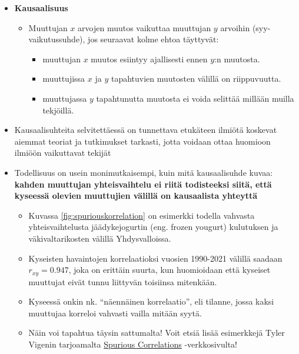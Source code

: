 \documentclass[
]{book}
\providecommand{\tightlist}{%
  \setlength{\itemsep}{0pt}\setlength{\parskip}{0pt}}
\begin{document}
\FloatBarrier

\begin{itemize}
\item
  \textbf{Kausaalisuus}

  \begin{itemize}
  \tightlist
  \item
    Muuttujan \(x\) arvojen muutos vaikuttaa muuttujan \(y\) arvoihin (syy-vaikutussuhde), jos seuraavat kolme ehtoa täyttyvät:

    \begin{itemize}
    \tightlist
    \item
      muuttujan \(x\) muutos esiintyy ajallisesti ennen \(y\):n muutosta.
    \item
      muuttujissa \(x\) ja \(y\) tapahtuvien muutosten välillä on riippuvuutta.
    \item
      muuttujassa \(y\) tapahtunutta muutosta ei voida selittää millään muilla tekjöillä.
    \end{itemize}
  \end{itemize}
\item
  Kausaalisuhteita selvitettäessä on tunnettava etukäteen ilmiötä koskevat aiemmat teoriat ja tutkimukset tarkasti, jotta voidaan ottaa huomioon ilmiöön vaikuttavat tekijät
\item
  Todellisuus on usein monimutkaisempi, kuin mitä kausaalisuhde kuvaa: \textbf{kahden muuttujan yhteisvaihtelu ei riitä todisteeksi siitä, että kyseessä olevien muuttujien välillä on kausaalista yhteyttä}

  \begin{itemize}
  \tightlist
  \item
    Kuvassa \ref{fig:spuriouskorrelation} on esimerkki todella vahvasta yhteisvaihtelusta jäädykejogurtin (eng. frozen yougurt) kulutuksen ja väkivaltarikosten välillä Yhdysvalloissa.
  \item
    Kyseisten havaintojen korrelaatioksi vuosien 1990-2021 välillä saadaan \(r_{xy} = 0.947\), joka on erittäin suurta, kun huomioidaan että kyseiset muuttujat eivät tunnu liittyvän toisiinsa mitenkään.
  \item
    Kyseessä onkin nk. ``näennäinen korrelaatio'', eli tilanne, jossa kaksi muuttujaa korreloi vahvasti vailla mitään syytä.
  \item
    Näin voi tapahtua täysin sattumalta! Voit etsiä lisää esimerkkejä Tyler Vigenin tarjoamalta \href{https://tylervigen.com/spurious-correlations}{Spurious Correlations} -verkkosivulta!
  \end{itemize}
\end{itemize}
\end{document}
